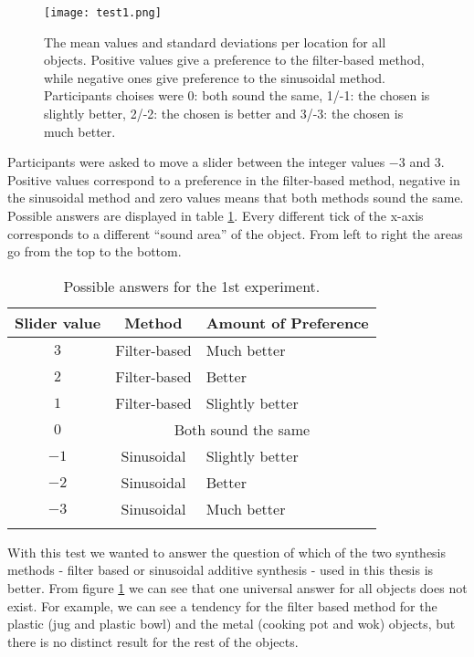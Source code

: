 \begin{figure}[H]
  \centering
    \texttt{[image: test1.png]}
      \caption{The mean values and standard deviations per location for all objects. Positive values give a preference to the filter-based method, while negative ones give preference to the sinusoidal method. Participants choises were 0: both sound the same, 1/-1: the chosen is slightly better, 2/-2: the chosen is better and 3/-3: the chosen is much better.}\label{fig:test1}
\end{figure}

Participants were asked to move a slider between the integer values $-3$ and $3$. Positive values correspond to a preference in the filter-based method, negative in the sinusoidal method and zero values means that both methods sound the same. Possible answers are displayed in table \ref{tab:test1_ans}. Every different tick of the x-axis corresponds to a different ``sound area'' of the object. From left to right the areas go from the top to the bottom.

\begin{table}[H]
	\centering
    \begin{tabular}{ c  c  l  }
    \toprule
    \textbf{Slider value} & \textbf{Method} & \textbf{Amount of Preference} \\ \toprule
    \addlinespace
    $3$ & Filter-based & Much better  \\
    $2$ & Filter-based & Better \\
    $1$ & Filter-based & Slightly better \\ 
    \addlinespace
    $0$ & \multicolumn{2}{c}{Both sound the same} \\
    \addlinespace
    $-1$ & Sinusoidal & Slightly better \\ 
    $-2$ & Sinusoidal & Better \\ 
    $-3$ & Sinusoidal & Much better \\
    \addlinespace
    \bottomrule
    \end{tabular}
    \caption{Possible answers for the 1st experiment.}
    \label{tab:test1_ans}
\end{table}  

With this test we wanted to answer the question of which of the two synthesis methods - filter based or sinusoidal additive synthesis - used in this thesis is better. From figure \ref{fig:test1} we can see that one universal answer for all objects does not exist. For example, we can see a tendency for the filter based method for the plastic (jug and plastic bowl) and the metal (cooking pot and wok) objects, but there is no distinct result for the rest of the objects.

